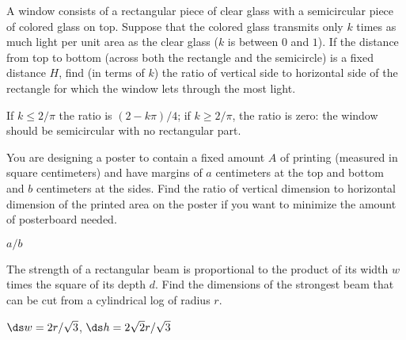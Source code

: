 \begin{exercises}
\begin{exercise} A window consists of a rectangular piece of clear glass with
a semicircular piece of colored glass on top.  Suppose that the
colored glass transmits only $k$ times as much light per unit area as
the clear glass ($k$ is between $0$ and $1$).  If the distance from
top to bottom (across both the rectangle and the semicircle) is a
fixed distance $H$,
find (in terms of $k$) the ratio of vertical side to horizontal side
of the rectangle for which the window lets through the most light.
\begin{answer} If $k\le 2/\pi$ the ratio is $(2-k\pi)/4$; if $k\ge 2/\pi$,
the ratio is zero: the window should be semicircular with no
rectangular part.
\end{answer}\end{exercise}

\begin{exercise} You are designing a poster to contain a fixed amount $A$ of
printing (measured in square centimeters) and have margins of $a$
centimeters at the top and bottom and $b$ centimeters at the sides.
Find the ratio of vertical dimension to horizontal dimension of the
printed area on the poster if you want to minimize the amount of
posterboard needed.
\begin{answer} $a/b$
\end{answer}\end{exercise}

\begin{exercise}
The strength of a rectangular beam is proportional to the product of its
width $w$ times the square of its depth $d$.  
Find the dimensions of the strongest
beam that can be cut from a cylindrical log of radius $r$.
\begin{answer} $\ds w=2r/\sqrt3$, $\ds h=2\sqrt2r/\sqrt3$
\end{answer}\end{exercise}





\end{exercises}
